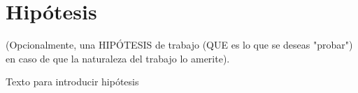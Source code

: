 \chapter{Hipótesis}

(Opcionalmente, una HIPÓTESIS de trabajo (QUE es lo que se deseas "probar") en caso de que la naturaleza del trabajo lo amerite).

Texto para introducir hipótesis

